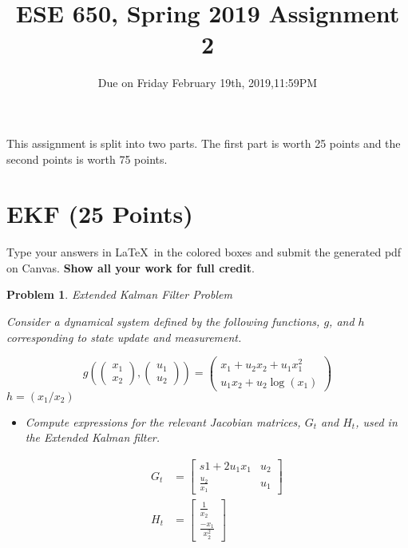 \documentclass{article}
\title{ESE 650, Spring 2019 Assignment 2}
\date{Due on Friday February 19th, 2019,11:59PM}
\newtheorem{problem}{Problem}
\begin{document}
\maketitle
This assignment is split into two parts. The first part is worth 25 points and the second points is worth 75 points. 
\section{EKF (25 Points)}
Type your answers in \LaTeX\ in the colored boxes and submit the generated pdf on Canvas.  \textbf{Show all your work for full credit}. 


\begin{problem}
Extended Kalman Filter Problem

Consider a dynamical system defined by the following functions, $g$, and $h$ corresponding to state update and measurement.

\[
g \left( 
\begin{pmatrix} x_1 \\ x_2 \end{pmatrix},
\begin{pmatrix} u_1 \\ u_2 \end{pmatrix}
\right) 
= \begin{pmatrix}
x_1 + u_2 x_2 + u_1 x_1^2 \\
u_1 x_2 + u_2 \log (x_1)
 \end{pmatrix}
\]
$h = (x_1 / x_2)$
\begin{itemize}

\item Compute expressions for the relevant Jacobian matrices, $G_t$ and $H_t$, used in the Extended Kalman filter.

\begin{tcolorbox}
\begin{align*}
 G_t &= \begin{bmatrix}s
         1+2u_1x_1 & u_2
         \\
         \frac{u_2}{x_1} & u_1
        \end{bmatrix}
\\
H_t &= \begin{bmatrix}
        \frac{1}{x_2}
        \\
       \frac{- x_1}{x^2_2}
       \end{bmatrix}
\end{align*}




\end{tcolorbox}


\end{itemize}
\end{problem}
\end{document}
